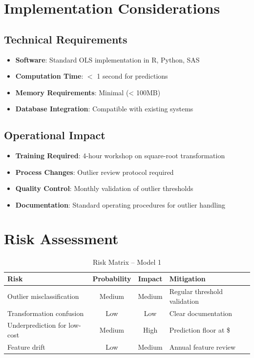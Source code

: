 \section{Implementation Considerations}

\subsection{Technical Requirements}

\begin{itemize}
    \item \textbf{Software}: Standard OLS implementation in R, Python, SAS
    \item \textbf{Computation Time}: $<$ 1 second for predictions
    \item \textbf{Memory Requirements}: Minimal (< 100MB)
    \item \textbf{Database Integration}: Compatible with existing systems
\end{itemize}

\subsection{Operational Impact}

\begin{itemize}
    \item \textbf{Training Required}: 4-hour workshop on square-root transformation
    \item \textbf{Process Changes}: Outlier review protocol required
    \item \textbf{Quality Control}: Monthly validation of outlier thresholds
    \item \textbf{Documentation}: Standard operating procedures for outlier handling
\end{itemize}

\section{Risk Assessment}

\begin{table}[h]
\centering
\caption{Risk Matrix -- Model 1}
\begin{tabular}{p{3.5cm}ccp{5cm}}
\toprule
\textbf{Risk} & \textbf{Probability} & \textbf{Impact} & \textbf{Mitigation} \\
\midrule
Outlier misclassification & Medium & Medium & Regular threshold validation \\
Transformation confusion & Low & Low & Clear documentation \\
Underprediction for low-cost & Medium & High & Prediction floor at \$\ModelOnePredictionFloor{} \\
Feature drift & Low & Medium & Annual feature review \\
\bottomrule
\end{tabular}
\end{table}

